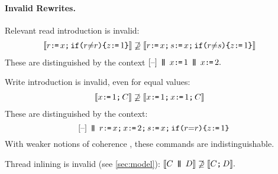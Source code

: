 



\paragraph{Invalid Rewrites.}
Relevant read introduction is invalid:
\begin{align*}
  \llbracket r \texttt{:}\mkern-1mu\texttt{=}\, x \texttt{;}\,\allowbreak \texttt{if}\allowbreak\texttt{(}r {\neq} r\texttt{)} \allowbreak\texttt{\{} z \texttt{:}\mkern-1mu\texttt{=}\, 1 \texttt{\}}\rrbracket
  &\not\supseteq
  \llbracket r \texttt{:}\mkern-1mu\texttt{=}\, x \texttt{;}\,\allowbreak s \texttt{:}\mkern-1mu\texttt{=}\, x  \texttt{;}\,\allowbreak \texttt{if}\allowbreak\texttt{(}r {\neq}s\texttt{)} \allowbreak\texttt{\{} z \texttt{:}\mkern-1mu\texttt{=}\, 1 \texttt{\}}\rrbracket
\end{align*}
These are distinguished by the context
\begin{math}
  \hole{} \PAR x\GETS1\PAR x\GETS2.
\end{math}

Write introduction is invalid, even for equal values:
\begin{align*}
  \llbracket x \texttt{:}\mkern-1mu\texttt{=}\, 1 \texttt{;}\,\allowbreak C\rrbracket 
  &\not\supseteq
  \llbracket x \texttt{:}\mkern-1mu\texttt{=}\, 1 \texttt{;}\,\allowbreak x \texttt{:}\mkern-1mu\texttt{=}\, 1 \texttt{;}\,\allowbreak C\rrbracket
\end{align*}
These are distinguished by the context:
\begin{displaymath}
  \hole{} \PAR
  r\GETS x \SEMI
  x\GETS2 \SEMI
  s\GETS x\SEMI
  \IF{\aReg {=} \aReg} \THEN \cLoc \GETS 1 \FI
\end{displaymath}
With weaker notions of coherence
\cite{Manson:2005:JMM:1047659.1040336, Dolan:2018:BDR:3192366.3192421}, these
commands are indistinguishable.

Thread inlining is invalid (see \textsection\ref{sec:model}):
\begin{math}
  \llbracket C \,\mathbin{\texttt{\textbf{|}}\mkern-6mu\texttt{\textbf{|}}}\, D\rrbracket
  \not\supseteq
  \llbracket C \texttt{;}\,\allowbreak D\rrbracket.
\end{math}


